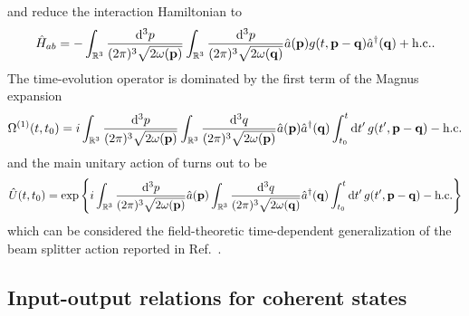 and reduce the interaction Hamiltonian to
\begin{equation}
	\hat{H}_{ab}
	=
	-
	\int_{\mathbb{R}^3}
	\frac{\dd[3]{p}}{(2\pi)^3\sqrt{2\omega(\vb{p})}}
	\int_{\mathbb{R}^3}
	\frac{\dd[3]{p}}{(2\pi)^3\sqrt{2\omega(\vb{q})}}
	\hat{a}(\vb{p})
	g(t,\vb{p}-\vb{q})
	\hat{a}^\dagger(\vb{q})
	+
	\text{h.c.}
	.
\end{equation}
The time-evolution operator is dominated by the first term of the Magnus expansion
\begin{equation}
	\Omega^{(1)}(t,t_0)
	=
	i
	\int_{\mathbb{R}^3}
	\frac{\dd[3]{p}}{(2\pi)^3\sqrt{2\omega(\vb{p})}}
	\int_{\mathbb{R}^3}
	\frac{\dd[3]{q}}{(2\pi)^3\sqrt{2\omega(\vb{p})}}
	\hat{a}(\vb{p})
	\hat{a}^\dagger(\vb{q})
	\int_{t_0}^t
	\dd{t^\prime}
	g(t^\prime,\vb{p}-\vb{q})
	-
	\text{h.c.}
\end{equation}
and the main unitary action of turns out to be
\begin{equation}
	\hat{U}(t,t_0)
	=
	\exp\left\{
		i
		\int_{\mathbb{R}^3}
		\frac{\dd[3]{p}}{(2\pi)^3\sqrt{2\omega(\vb{p})}}
		\hat{a}(\vb{p})
		\int_{\mathbb{R}^3}
		\frac{\dd[3]{q}}{(2\pi)^3\sqrt{2\omega(\vb{q})}}
		\hat{a}^\dagger(\vb{q})
		\int_{t_0}^t
		\dd{t^\prime}
		g(t^\prime,\vb{p}-\vb{q})
		-
		\text{h.c.}
	\right\}
\end{equation}
which can be considered the field-theoretic time-dependent generalization of the beam splitter action reported in Ref.~\cite{Leonhardt2003,Haroche2006}.

\FloatBarrier
\subsection{Input-output relations for coherent states}